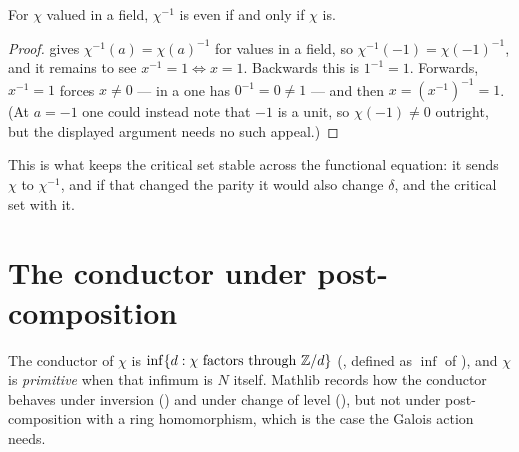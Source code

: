 \begin{lemma}
  \label{lem:even-inv}
  \leanok
  For $\chi$ valued in a field, $\chi^{-1}$ is even if and only if $\chi$ is.
\end{lemma}
\begin{proof}
  \leanok
   gives $\chi^{-1}(a) = \chi(a)^{-1}$ for values in a
  field, so $\chi^{-1}(-1) = \chi(-1)^{-1}$, and it remains to see $x^{-1} = 1 \iff x = 1$.
  Backwards this is $1^{-1} = 1$. Forwards, $x^{-1} = 1$ forces $x \neq 0$ --- in a
   one has $0^{-1} = 0 \neq 1$ --- and then $x = (x^{-1})^{-1} = 1$.
  (At $a = -1$ one could instead note that $-1$ is a unit, so $\chi(-1) \neq 0$ outright,
  but the displayed argument needs no such appeal.)
\end{proof}

This is what keeps the critical set stable across the functional equation: it sends $\chi$
to $\chi^{-1}$, and if that changed the parity it would also change $\delta$, and the
critical set with it.

\section{The conductor under post-composition}
\label{sec:dirichlet-conductor}

The conductor of $\chi$ is $\inf \{ d : \chi \text{ factors through } \mathbb{Z}/d \}$
(, defined as $\inf$ of
), and $\chi$ is \emph{primitive} when that
infimum is $N$ itself. Mathlib records how the conductor behaves under inversion
() and under change of level
(), but not under post-composition with a
ring homomorphism, which is the case the Galois action needs.

